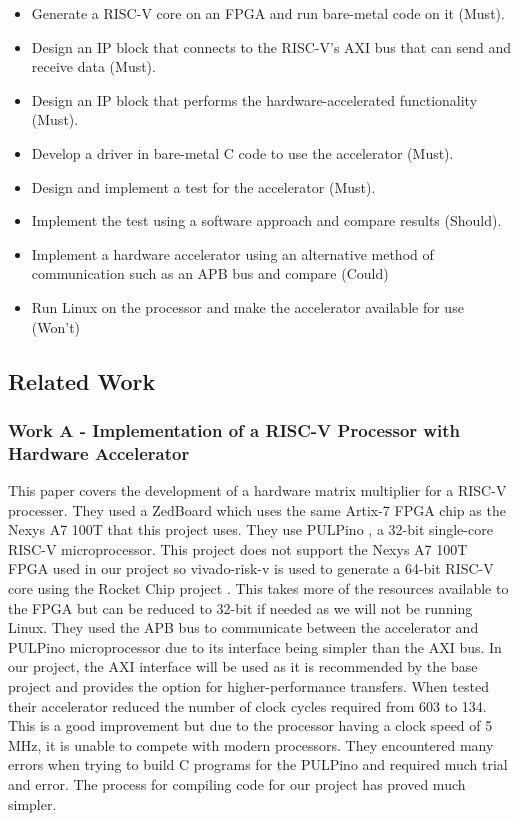 \begin{itemize}
	\item Generate a RISC-V core on an FPGA and run bare-metal code on it (Must).
	\item Design an IP block that connects to the RISC-V's AXI bus that can send and receive data (Must).
	\item Design an IP block that performs the hardware-accelerated functionality (Must).
	\item Develop a driver in bare-metal C code to use the accelerator (Must).
	\item Design and implement a test for the accelerator (Must).
	\item Implement the test using a software approach and compare results (Should).
	\item Implement a hardware accelerator using an alternative method of communication such as an APB bus and compare (Could)
	\item Run Linux on the processor and make the accelerator available for use (Won't)
\end{itemize}

\newpage

\subsection{Related Work}
\subsubsection{Work A - Implementation of a RISC-V Processor with Hardware Accelerator \cite{risc-v_hard_accel}}
This paper covers the development of a hardware matrix multiplier for a RISC-V processer. They used a ZedBoard which uses the same Artix-7 FPGA chip as the Nexys A7 100T that this project uses. They use PULPino \cite{pulpino}, a 32-bit single-core RISC-V microprocessor. This project does not support the Nexys A7 100T FPGA used in our project so vivado-risk-v \cite{vivado-risk-v} is used to generate a 64-bit RISC-V core using the Rocket Chip project \cite{rocketchip}. This takes more of the resources available to the FPGA but can be reduced to 32-bit if needed as we will not be running Linux. They used the APB bus to communicate between the accelerator and PULPino microprocessor due to its interface being simpler than the AXI bus. In our project, the AXI interface will be used as it is recommended by the base project and provides the option for higher-performance transfers. When tested their accelerator reduced the number of clock cycles required from 603 to 134. This is a good improvement but due to the processor having a clock speed of 5 MHz, it is unable to compete with modern processors. They encountered many errors when trying to build C programs for the PULPino and required much trial and error. The process for compiling code for our project has proved much simpler.

